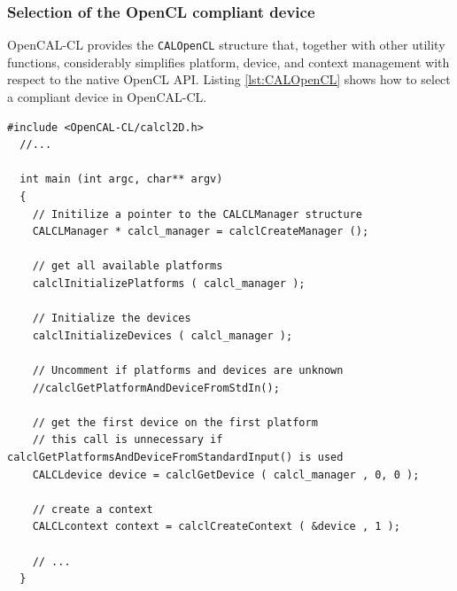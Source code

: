 \subsubsection{Selection of the OpenCL compliant device}

OpenCAL-CL provides the \verb'CALOpenCL' structure that, together with
other utility functions, considerably simplifies platform, device, and
context management with respect to the native OpenCL API. Listing
\ref{lst:CALOpenCL} shows how to select a compliant device in
OpenCAL-CL.

\begin{lstlisting}[float,floatplacement=H, label=lst:CALOpenCL, caption=Access to platform and devices.]
  #include <OpenCAL-CL/calcl2D.h>
  //...

  int main (int argc, char** argv)
  {
    // Initilize a pointer to the CALCLManager structure
    CALCLManager * calcl_manager = calclCreateManager ();

    // get all available platforms
    calclInitializePlatforms ( calcl_manager );

    // Initialize the devices
    calclInitializeDevices ( calcl_manager );

    // Uncomment if platforms and devices are unknown
    //calclGetPlatformAndDeviceFromStdIn();

    // get the first device on the first platform
    // this call is unnecessary if calclGetPlatformsAndDeviceFromStandardInput() is used
    CALCLdevice device = calclGetDevice ( calcl_manager , 0, 0 );

    // create a context
    CALCLcontext context = calclCreateContext ( &device , 1 );

    // ...
  }
\end{lstlisting}

